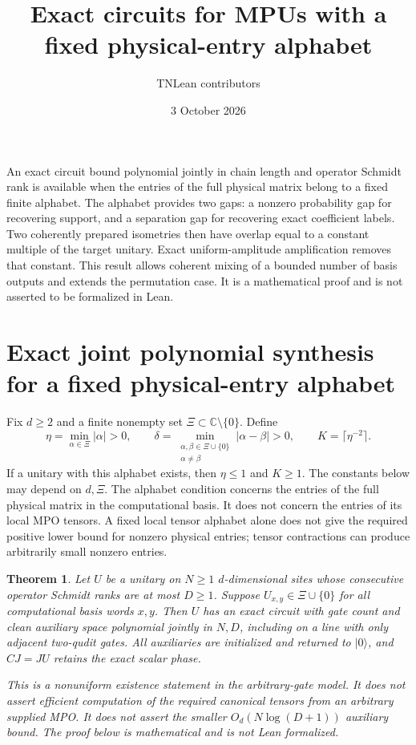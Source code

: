 \documentclass[11pt]{article}
\title{Exact circuits for MPUs with a fixed physical-entry alphabet}
\author{TNLean contributors}
\date{3 October 2026}
\newtheorem{theorem}{Theorem}
\begin{document}
\maketitle

An exact circuit bound polynomial jointly in chain length and
operator Schmidt rank is available when the entries of the full
physical matrix belong to a fixed finite alphabet. The alphabet
provides two gaps: a nonzero probability gap for recovering support,
and a separation gap for recovering exact coefficient labels.
Two coherently prepared isometries then have overlap equal to a
constant multiple of the target unitary. Exact uniform-amplitude
amplification removes that constant. This result allows coherent
mixing of a bounded number of basis outputs and extends the
permutation case. It is a mathematical proof and is not asserted
to be formalized in Lean.

\section{Exact joint polynomial synthesis for a fixed physical-entry alphabet}

Fix $d\ge2$ and a finite nonempty set
$\Xi\subset\mathbb C\setminus\{0\}$. Define
\[
 \eta=\min_{\alpha\in\Xi}|\alpha|>0,\qquad
 \delta=\min_{\substack{\alpha,\beta\in\Xi\cup\{0\}\\
                              \alpha\ne\beta}}|\alpha-\beta|>0,
 \qquad K=\lceil\eta^{-2}\rceil.
\]
If a unitary with this alphabet exists, then $\eta\le1$ and
$K\ge1$. The constants below may depend on $d,\Xi$.
The alphabet condition concerns the entries of the full physical
matrix in the computational basis. It does not concern the entries
of its local MPO tensors. A fixed local tensor alphabet alone
does not give the required positive lower bound for nonzero
physical entries; tensor contractions can produce arbitrarily
small nonzero entries.

\begin{theorem}
Let $U$ be a unitary on $N\ge1$ $d$-dimensional sites whose
consecutive operator Schmidt ranks are at most $D\ge1$.
Suppose $U_{x,y}\in\Xi\cup\{0\}$ for all computational basis
words $x,y$.
Then $U$ has an exact circuit with gate count and clean auxiliary
space polynomial jointly in $N,D$, including on a line with
only adjacent two-qudit gates. All auxiliaries are initialized
and returned to $|0\rangle$, and $CJ=JU$ retains the exact
scalar phase.

This is a nonuniform existence statement in the arbitrary-gate
model. It does not assert efficient computation of the required
canonical tensors from an arbitrary supplied MPO. It does not
assert the smaller $O_d(N\log(D+1))$ auxiliary bound.
The proof below is mathematical and is not Lean formalized.
\end{theorem}
\end{document}
